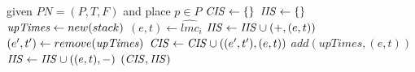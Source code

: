 \begin{algorithmic}
\Require given $PN=(P,T,F)$ and place $p\in P$
    \State $\mathit{CIS} \gets \{\}$
    \State $\mathit{IIS} \gets \{\}$
    \State $\mathit{upTimes} \gets new(stack)$ 
        \State $(e,t) \gets \hat{lmc}_i$
                \State $\mathit{IIS} \gets \mathit{IIS} \cup (+,(e,t))$
            \Else
                \State $(e^\prime, t^\prime) \gets remove(\mathit{upTimes})$
                \State $\mathit{CIS} \gets \mathit{CIS} \cup ((e^\prime, t^\prime), (e,t))$
            \EndIf
        \EndIf
            \State $add(upTimes, (e,t))$
        \EndIf
    \EndFor
            \State $\mathit{IIS} \gets \mathit{IIS} \cup ((e,t), -)$
        \EndFor
    \EndIf
    \State \Return $(\mathit{CIS}, \mathit{IIS})$
\EndFunction
\end{algorithmic}